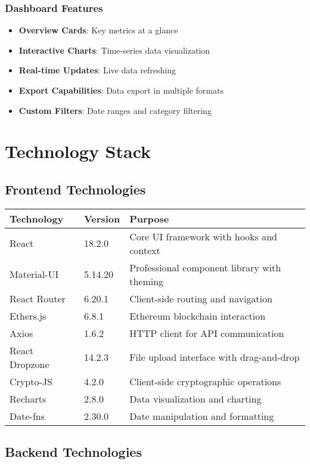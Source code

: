 \documentclass[11pt,a4paper]{article}
\begin{document}
\subsubsection{Dashboard Features}
\begin{itemize}
    \item \textbf{Overview Cards}: Key metrics at a glance
    \item \textbf{Interactive Charts}: Time-series data visualization
    \item \textbf{Real-time Updates}: Live data refreshing
    \item \textbf{Export Capabilities}: Data export in multiple formats
    \item \textbf{Custom Filters}: Date ranges and category filtering
\end{itemize}

\section{Technology Stack}

\subsection{Frontend Technologies}

\begin{longtable}{|p{3cm}|p{2cm}|p{8cm}|}
\hline
\textbf{Technology} & \textbf{Version} & \textbf{Purpose} \\
\hline
React & 18.2.0 & Core UI framework with hooks and context \\
\hline
Material-UI & 5.14.20 & Professional component library with theming \\
\hline
React Router & 6.20.1 & Client-side routing and navigation \\
\hline
Ethers.js & 6.8.1 & Ethereum blockchain interaction \\
\hline
Axios & 1.6.2 & HTTP client for API communication \\
\hline
React Dropzone & 14.2.3 & File upload interface with drag-and-drop \\
\hline
Crypto-JS & 4.2.0 & Client-side cryptographic operations \\
\hline
Recharts & 2.8.0 & Data visualization and charting \\
\hline
Date-fns & 2.30.0 & Date manipulation and formatting \\
\hline
\end{longtable}

\subsection{Backend Technologies}
\end{document}
